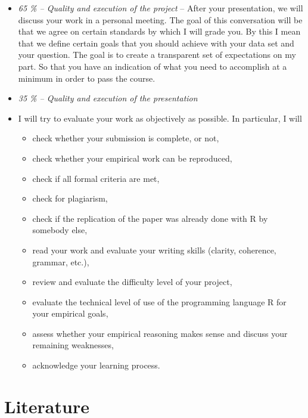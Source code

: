 \documentclass[
  a4paper,
  onecolumn,
  oneside]{scrartcl}
\providecommand{\tightlist}{%
  \setlength{\itemsep}{0pt}\setlength{\parskip}{0pt}}\usepackage{longtable,booktabs,array}
\begin{document}
\begin{itemize}
\item
  \emph{65 \% -- Quality and execution of the project} -- After your
  presentation, we will discuss your work in a personal meeting. The
  goal of this conversation will be that we agree on certain standards
  by which I will grade you. By this I mean that we define certain goals
  that you should achieve with your data set and your question. The goal
  is to create a transparent set of expectations on my part. So that you
  have an indication of what you need to accomplish at a minimum in
  order to pass the course.
\item
  \emph{35 \% -- Quality and execution of the presentation}
\item
  I will try to evaluate your work as objectively as possible. In
  particular, I will

  \begin{itemize}
  \tightlist
  \item
    check whether your submission is complete, or not,
  \item
    check whether your empirical work can be reproduced,
  \item
    check if all formal criteria are met,
  \item
    check for plagiarism,
  \item
    check if the replication of the paper was already done with R by
    somebody else,
  \item
    read your work and evaluate your writing skills (clarity, coherence,
    grammar, etc.),
  \item
    review and evaluate the difficulty level of your project,
  \item
    evaluate the technical level of use of the programming language R
    for your empirical goals,
  \item
    assess whether your empirical reasoning makes sense and discuss your
    remaining weaknesses,
  \item
    acknowledge your learning process.
  \end{itemize}
\end{itemize}

\section{Literature}\label{literature}

\renewcommand{\bibsection}{}

\end{document}
